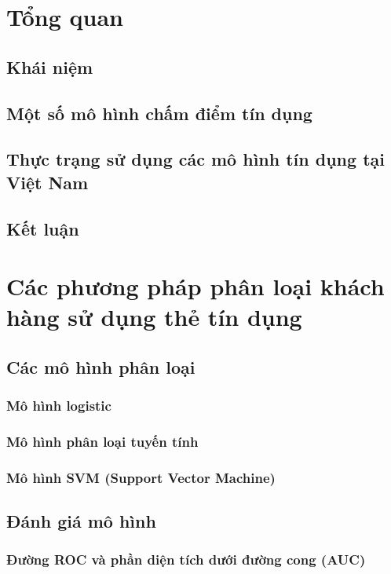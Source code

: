 \documentclass[a4paper]{report}\usepackage[]{graphicx}\usepackage[]{color}
\begin{document}
\chapter{Tổng quan}
\section{Khái niệm}

\section{Một số mô hình chấm điểm tín dụng}

\section{Thực trạng sử dụng các mô hình tín dụng tại Việt Nam}

\section{Kết luận}


\chapter{Các phương pháp phân loại khách hàng sử dụng thẻ tín dụng}
\section{Các mô hình phân loại}
\subsection{Mô hình logistic}
\subsection{Mô hình phân loại tuyến tính}
\subsection{Mô hình SVM (Support Vector Machine)}

\section{Đánh giá mô hình}
\subsection{Đường ROC và phần diện tích dưới đường cong (AUC)}
\end{document}

